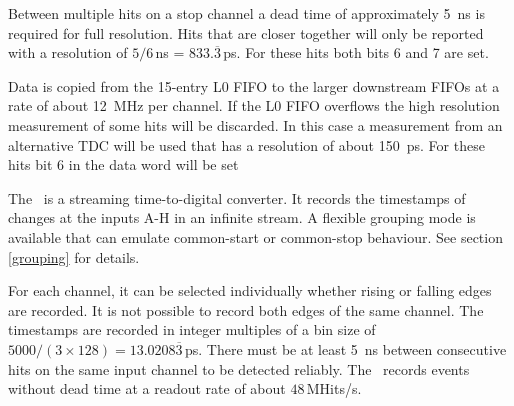 {    Between multiple hits on a stop channel a dead time of approximately
    \SI{5}{\nano\second} is required for full resolution.  Hits that are
    closer together will only be reported with a resolution of
    $5/6$\,\si{\nano\second} = $833.\overline{3}$\,\si{\pico\second}. For these
    hits both bits 6 and 7 are set.

    Data is copied from the 15-entry L0 FIFO to the larger downstream FIFOs at
    a rate of about \SI{12}{\mega\hertz} per channel.  If the L0 FIFO
    overflows the high resolution measurement of some hits will be discarded. 
    In this case a measurement from an alternative TDC will be used that has a
    resolution of about \SI{150}{\pico\second}.  For these hits bit 6 in the
    data word will be set
} { %
    The \deviceName\ is a streaming time-to-digital converter. It records the
    timestamps of changes at the inputs A-H in an infinite stream.  A flexible
    grouping mode is available that can emulate common-start or common-stop
    behaviour. See section \ref{grouping} for details.

    For each channel, it can be selected individually whether rising or
    falling edges are recorded. It is not possible to record both edges of the
    same channel.  The timestamps are recorded in integer multiples of a bin
    size of $5000/(3\times 128) = 13.0208\overline{3}$\,\si{\pico\second}. 
    There must be at least \SI{5}{\nano\second} between consecutive hits on
    the same input channel to be detected reliably.  The \deviceName\ records
    events without dead time at a readout rate of about $48$\,MHits/s.
}